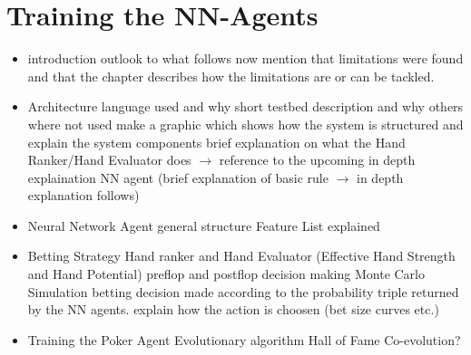 \section{Training the NN-Agents}
\begin{itemize}
\item introduction
\subitem outlook to what follows now
\subitem mention that limitations were found and that the chapter describes how the limitations are or can be tackled.
\item Architecture
\subitem language used and why
\subitem short testbed description and why others where not used
\subitem make a graphic which shows how the system is structured and explain the system components
\subsubitem brief explanation on what the Hand Ranker/Hand Evaluator does $\rightarrow$ reference to the upcoming in depth explaination
\subsubitem NN agent (brief explanation of basic rule $\rightarrow$ in depth explanation follows)
\item Neural Network Agent
\subitem general structure
\subitem Feature List explained
\item Betting Strategy
\subitem Hand ranker and Hand Evaluator (Effective Hand Strength and Hand Potential)
\subitem preflop and postflop decision making
\subsubitem Monte Carlo Simulation
\subitem betting decision made according to the probability triple returned by the NN agents.
\subsubitem explain how the action is choosen (bet size curves etc.)
\item Training the Poker Agent
\subitem Evolutionary algorithm
\subitem Hall of Fame
\subitem Co-evolution?
\end{itemize}
